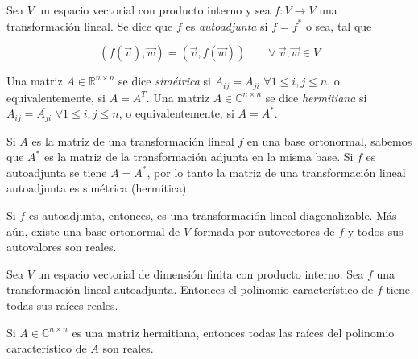 {\begin{definition}
Sea $V$ un espacio vectorial  con producto interno y sea $f: V \rightarrow V$ una transformación lineal. Se dice que $f$ es \textit{autoadjunta}  si   $f= f ^{*}$ o sea, tal que


 \begin{equation}
(f(\vec{v}),\vec{w})=(\vec{v},f (\vec{w})) \qquad  \forall  ~ \vec{v}, \vec{w}\in V 
 \label{250}
\end{equation}
\end{definition}


\bigskip
\begin{definition}
 
Una matriz    $A \in \mathbb{R}^{n \times  n  }$   se dice \textit{simétrica} si $A _{ij}={A _{ji}}$    $\forall  1 \le i,j \le n$, o equivalentemente, si $A=A^T$. Una matriz  $A \in \mathbb{C}^{n \times  n  }$ se dice\textit{ hermitiana} si $A _{ij}=\overline {A _{ji}}$ $\forall  1 \le i,j \le n$, o equivalentemente, si $A=A^*$.  
\end{definition}
\bigskip

Si $A$ es la matriz de una transformación lineal $f$ en una base  ortonormal, sabemos que $A ^{*}$ es la matriz de la transformación adjunta en la misma base. Si $f$ es autoadjunta se tiene $A= A ^{*}$, por lo tanto la matriz de una transformación lineal autoadjunta es simétrica (hermítica).










\bigskip

Si $f$ es autoadjunta, entonces, es una transformación lineal  diagonalizable. Más aún,  existe una base ortonormal de $V$ formada por autovectores de $f$ y todos sus autovalores son reales. 

\bigskip


\begin{theorem}

Sea $V$ un espacio vectorial  de dimensión finita con producto interno. Sea $f$ una transformación lineal autoadjunta. Entonces el polinomio característico de $f$ tiene todas sus raíces reales.

\end{theorem}
\bigskip

\begin{remark}
 Si $A \in \mathbb{C}^{n \times  n  }$ es una matriz hermitiana, entonces todas las raíces del polinomio característico de $A$ son reales.
\end{remark} 
 
}
